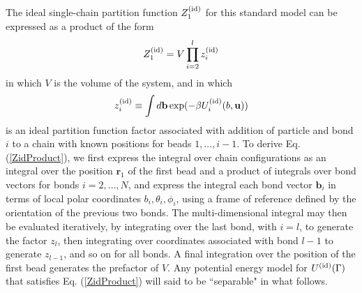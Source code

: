 \documentclass[12pt]{article}
\newcommand{\vv}[1]{\mathbf{#1}}
\newcommand\chain{\Gamma}
\newcommand\Uid{U^{({\rm id})}}
\newcommand\Zid{Z^{({\rm id})}}
\newcommand\qbead{\vv{r}_{1}}
\newcommand\nbead{l}
\newcommand\vbond{\vv{b}}
\newcommand\ubond{\vv{u}}
\newcommand\rbond{b}
\newcommand\zid{z^{({\rm id})}}
\begin{document}
The ideal single-chain partition function $\Zid_{1}$ for this standard model can be expressed as a product of the form
\begin{equation}
    \Zid_{1} = V \prod_{i=2}^{\nbead} \zid_{i}
    \label{ZidProduct}
\end{equation}
in which $V$ is the volume of the system, and in which
\begin{equation}
    \zid_{i} \equiv \int d\vbond 
    \exp( -\beta \Uid_{i}(\rbond, \ubond) )
    \label{zidDef}
\end{equation}
is an ideal partition function factor associated with addition of particle and bond $i$ to a chain with known positions for beads $1, \ldots, i-1$. To derive Eq. (\ref{ZidProduct}), we first express the integral over chain configurations as an integral over the position $\qbead$ of the first bead and a product of integrals over bond vectors for bonds $i=2,\ldots,N$, and express the integral each bond vector $\vbond_{i}$ in terms of local polar coordinates $b_{i}, \theta_{i}, \phi_{i}$, using a frame of reference defined by the orientation of the previous two bonds. The multi-dimensional integral may then be evaluated iteratively, by integrating over the last bond, with $i=\nbead$, to generate the factor $z_{\nbead}$, then integrating over coordinates associated with bond $\nbead-1$ to generate $z_{\nbead-1}$, and so on for all bonds. A final integration over the position of the first bead generates the prefactor of $V$. Any potential energy model for $\Uid(\chain)$ that satisfies Eq. (\ref{ZidProduct}) will said to be ``separable" in what follows. 
\end{document}
